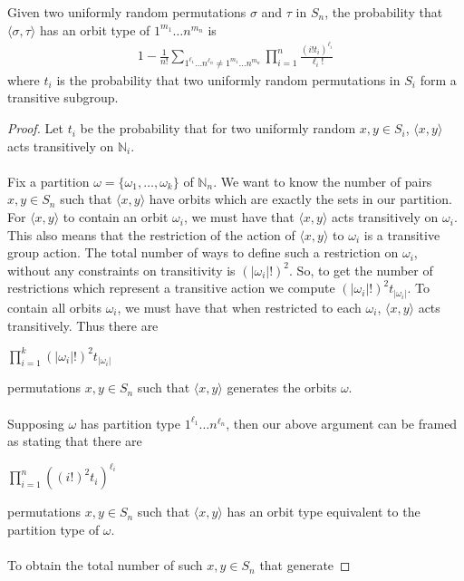 \begin{theorem}\label{dixons_theorem}
  Given two uniformly random permutations $\sigma$ and $\tau$ in $S_n$, the
  probability that $\langle\sigma, \tau\rangle$ has an orbit
  type of $1^{m_1}\dots n^{m_n}$ is
  \begin{align*}
    1-\frac{1}{n!}\sum_{1^{\ell_1}\dots n^{\ell_n} \ne 1^{m_1}\dots
    n^{m_n}}\prod_{i=1}^n{\frac{(i!t_{i})^{\ell_i}}{\ell_i!}}
  \end{align*}
  where $t_i$ is the probability that two uniformly random permutations in
  $S_i$ form a transitive subgroup.
\end{theorem}
\begin{proof}
  Let $t_i$ be the probability that for two uniformly random $x,y\in S_i$, $\langle x,y\rangle$ acts transitively on $\mathbb{N}_i$.
  \\\\Fix a partition $\omega=\{\omega_1,\dots,\omega_k\}$ of
  $\mathbb{N}_n$. We want to know the number of pairs $x,y\in S_n$ such
  that $\langle x,y\rangle$ have orbits which are exactly the sets in
  our partition. For $\langle x, y\rangle$ to contain an orbit
  $\omega_i$, we must have that $\langle x,y\rangle$ acts
  transitively on $\omega_i$. This also means that the
  restriction of the action of $\langle x,y\rangle$ to $\omega_i$ is a
  transitive group action.  The total number of ways to define such a
  restriction on $\omega_i$, without any constraints on transitivity is
  $(|\omega_i|!)^2$. So, to get the number of restrictions which
  represent a transitive action we compute
  $(|\omega_i|!)^2t_{|\omega_i|}$. To contain all orbits $\omega_i$,
  we must have that when restricted to each $\omega_i$, $\langle
  x,y\rangle$ acts transitively. Thus there are
  \begin{center}
    $\prod_{i=1}^k(|\omega_i|!)^2t_{|\omega_i|}$
  \end{center}
  permutations $x,y\in S_n$ such that $\langle x,y\rangle$ generates
  the orbits $\omega$.
  \\\\Supposing $\omega$ has partition type $1^{\ell_1}\dots
  n^{\ell_n}$, then our above argument can be framed as stating that there are
  \begin{center}
    $\prod_{i=1}^n{((i!)^2t_i)^{\ell_i}}$
  \end{center}
  permutations $x,y\in S_n$ such that $\langle x,y\rangle$ has an
  orbit type equivalent to the partition type of $\omega$.
  \\\\To obtain the total number of such $x,y \in S_n$ that generate

\end{proof}
